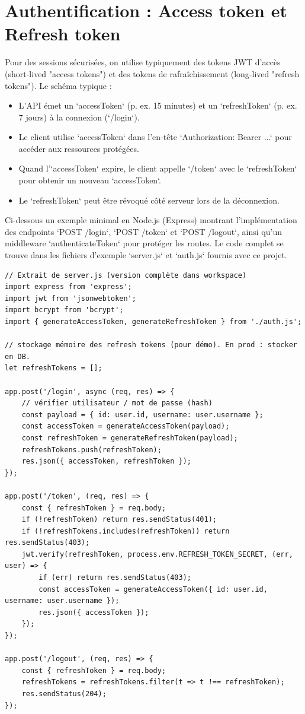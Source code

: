 \documentclass[a4paper,12pt]{book}
\begin{document}
\section{Authentification : Access token et Refresh token}

Pour des sessions sécurisées, on utilise typiquement des tokens JWT d'accès
(short-lived "access tokens") et des tokens de rafraîchissement (long-lived
"refresh tokens"). Le schéma typique :

\begin{itemize}
        \item L'API émet un `accessToken` (p. ex. 15 minutes) et un `refreshToken`
        (p. ex. 7 jours) à la connexion (`/login`).
        \item Le client utilise `accessToken` dans l'en-tête `Authorization: Bearer ...`
        pour accéder aux ressources protégées.
        \item Quand l'`accessToken` expire, le client appelle `/token` avec le
        `refreshToken` pour obtenir un nouveau `accessToken`.
        \item Le `refreshToken` peut être révoqué côté serveur lors de la déconnexion.
\end{itemize}

Ci-dessous un exemple minimal en Node.js (Express) montrant l'implémentation
des endpoints `POST /login`, `POST /token` et `POST /logout`, ainsi qu'un
middleware `authenticateToken` pour protéger les routes. Le code complet se
trouve dans les fichiers d'exemple `server.js` et `auth.js` fournis avec ce projet.

\begin{lstlisting}[style=javascript, caption=Exemple minimal d'authentification avec refresh tokens]
// Extrait de server.js (version complète dans workspace)
import express from 'express';
import jwt from 'jsonwebtoken';
import bcrypt from 'bcrypt';
import { generateAccessToken, generateRefreshToken } from './auth.js';

// stockage mémoire des refresh tokens (pour démo). En prod : stocker en DB.
let refreshTokens = [];

app.post('/login', async (req, res) => {
    // vérifier utilisateur / mot de passe (hash)
    const payload = { id: user.id, username: user.username };
    const accessToken = generateAccessToken(payload);
    const refreshToken = generateRefreshToken(payload);
    refreshTokens.push(refreshToken);
    res.json({ accessToken, refreshToken });
});

app.post('/token', (req, res) => {
    const { refreshToken } = req.body;
    if (!refreshToken) return res.sendStatus(401);
    if (!refreshTokens.includes(refreshToken)) return res.sendStatus(403);
    jwt.verify(refreshToken, process.env.REFRESH_TOKEN_SECRET, (err, user) => {
        if (err) return res.sendStatus(403);
        const accessToken = generateAccessToken({ id: user.id, username: user.username });
        res.json({ accessToken });
    });
});

app.post('/logout', (req, res) => {
    const { refreshToken } = req.body;
    refreshTokens = refreshTokens.filter(t => t !== refreshToken);
    res.sendStatus(204);
});
\end{lstlisting}
\end{document}
